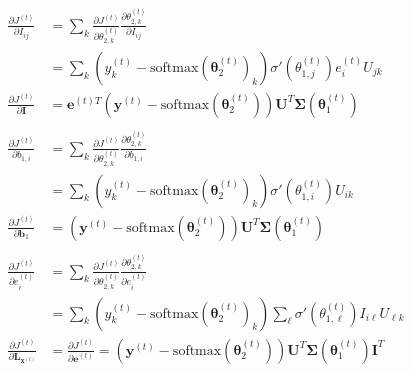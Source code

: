\documentclass{article}
\begin{document}
\begin{itemize}
    \begin{align*}
        \frac{\partial J^{(t)}}{\partial I_{ij}} &= \sum_k \frac{\partial J^{(t)}}{\partial \theta_{2, k}^{(t)}} \frac{\partial \theta_{2, k}^{(t)}}{\partial I_{ij}}\\
        &= \sum_k (y_k^{(t)} - \text{softmax}(\boldsymbol{\theta}_2^{(t)})_k) \sigma'(\theta_{1, j}^{(t)}) e_i^{(t)} U_{j k}\\
        \frac{\partial J^{(t)}}{\partial \mathbf{I}} &= \mathbf{e}^{(t) T}(\mathbf{y}^{(t)}-\text{softmax}(\boldsymbol{\theta}_2^{(t)})) \mathbf{U}^T \boldsymbol{\Sigma}(\boldsymbol{\theta}_1^{(t)})\\
        \\
        \frac{\partial J^{(t)}}{\partial b_{1,i}} &= \sum_k \frac{\partial J^{(t)}}{\partial \theta_{2, k}^{(t)}} \frac{\partial \theta_{2, k}^{(t)}}{\partial b_{1,i}}\\
        &= \sum_k (y_k^{(t)} - \text{softmax}(\boldsymbol{\theta}_2^{(t)})_k) \sigma'(\theta_{1, i}^{(t)}) U_{ik}\\
        \frac{\partial J^{(t)}}{\partial \mathbf{b}_{1}} &= (\mathbf{y}^{(t)}-\text{softmax}(\boldsymbol{\theta}_2^{(t)})) \mathbf{U}^T \boldsymbol{\Sigma}(\boldsymbol{\theta}_1^{(t)}) \\
        \\
        \frac{\partial J^{(t)}}{\partial e_i^{(t)}} &= \sum_k \frac{\partial J^{(t)}}{\partial \theta_{2, k}^{(t)}} \frac{\partial \theta_{2, k}^{(t)}}{\partial e_i^{(t)}}\\
        &= \sum_k (y_k^{(t)} - \text{softmax}(\boldsymbol{\theta}_2^{(t)})_k) \sum_\ell \sigma'(\theta_{1, \ell}^{(t)})I_{i \ell}U_{\ell k}\\
        \frac{\partial J^{(t)}}{\partial \mathbf{L}_{\mathbf{x}^{(t)}}} &= \frac{\partial J^{(t)}}{\partial \mathbf{e}^{(t)}} = (\mathbf{y}^{(t)}-\text{softmax}(\boldsymbol{\theta}_2^{(t)})) \mathbf{U}^T \boldsymbol{\Sigma}(\boldsymbol{\theta}_1^{(t)})\mathbf{I}^T\\
    \end{align*}
    

\end{itemize}
\end{document}

